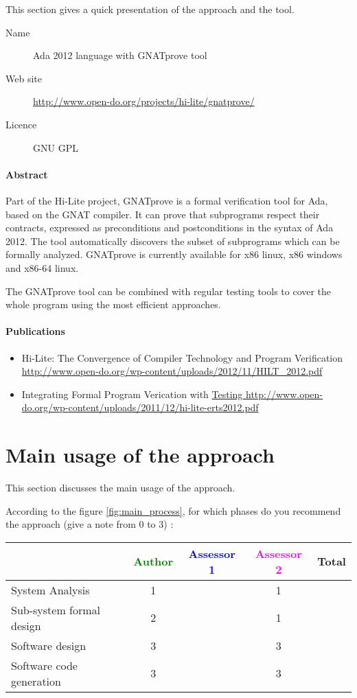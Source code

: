 This section gives a quick presentation of the approach and the tool.

\begin{description}
\item[Name] Ada 2012 language with GNATprove tool
\item[Web site] \url{http://www.open-do.org/projects/hi-lite/gnatprove/}
\item[Licence] GNU GPL
\end{description}

\paragraph{Abstract} Part of the Hi-Lite project, GNATprove is a
formal verification tool for Ada, based on the GNAT compiler. It can
prove that subprograms respect their contracts, expressed as
preconditions and postconditions in the syntax of Ada 2012. The tool
automatically discovers the subset of subprograms which can be
formally analyzed. GNATprove is currently available for x86 linux, x86
windows and x86-64 linux.

The GNATprove tool can be combined with regular testing tools to cover
the whole program using the most efficient approaches.


\paragraph{Publications}
\begin{itemize}
\item Hi-Lite: The Convergence of Compiler Technology and Program
  Verification
  \url{http://www.open-do.org/wp-content/uploads/2012/11/HILT_2012.pdf} 
\item Integrating Formal Program Verication with \url{Testing
  http://www.open-do.org/wp-content/uploads/2011/12/hi-lite-erts2012.pdf}
\end{itemize}



\section{Main usage of the approach}
\label{main_usage}
This section discusses the main usage of the approach.

According to the figure \ref{fig:main_process}, for which phases do you recommend the approach (give a note from 0 to  3) :

\begin{tabular}{|l | c | c | c | c|}
\hline
& \textcolor{green}{Author} & \textcolor{blue}{Assessor 1} & \textcolor{magenta}{Assessor 2} & Total \\
\hline 
System Analysis & 1 & & 1 &  \\
\hline
Sub-system formal design & 2 & & 1 & \\
\hline
Software design & 3 & & 3 & \\
\hline
Software code generation & 3 & & 3 & \\
\hline
\end{tabular}

